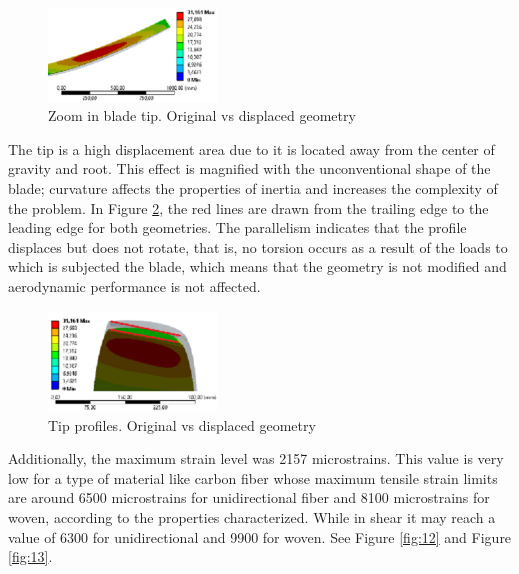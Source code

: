 \begin{figure}[H]
\begin{center}
  \includegraphics[width=0.4\textwidth]{p3}
\caption{Zoom in blade tip. Original vs displaced geometry}
\label{fig:10}       %
\end{center}
\end{figure}
The tip is a high displacement area due to it is located away from the center of gravity and root. This effect is magnified with the unconventional shape of the blade; curvature affects the properties of inertia and increases the complexity of the problem. In Figure \ref{fig:11}, the red lines are drawn from the trailing edge to the leading edge for both geometries. The parallelism indicates that the profile displaces but does not rotate, that is, no torsion occurs as a result of the loads to which is subjected the blade, which means that the geometry is not modified and aerodynamic performance is not affected.
\vspace{-1.0cm}

\begin{figure}[H]
\begin{center}
  \includegraphics[width=0.4\textwidth]{p4}
\caption{Tip profiles. Original vs displaced geometry}
\label{fig:11}       %
\end{center}
\end{figure}

Additionally, the maximum strain level was 2157 microstrains. This value is very low for a type of material like carbon fiber whose maximum tensile strain limits are around 6500 microstrains for unidirectional fiber and 8100 microstrains for woven, according to the properties characterized. While in shear it may reach a value of 6300 for unidirectional and 9900 for woven. See Figure \ref{fig:12} and Figure \ref{fig:13}.

